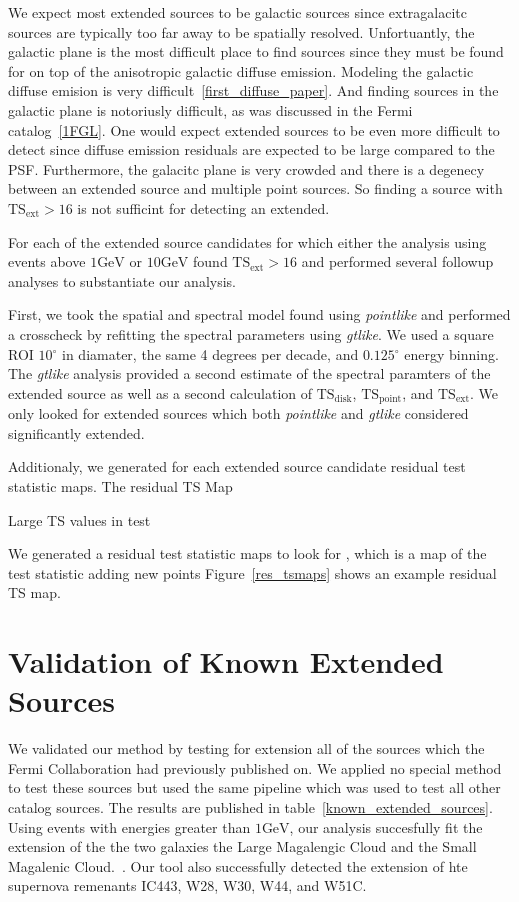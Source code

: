 \documentclass[preprint]{aastex}
\newcommand{\gev}{\text{GeV}\xspace}
\newcommand{\tsext}{\ensuremath{\text{TS}_\text{ext}}\xspace}
\newcommand{\ts}{\text{TS}\xspace}
\renewcommand{\deg}{\ensuremath{^\circ}\xspace}
\newcommand{\pointlike}{{\em pointlike}\xspace}
\newcommand{\gtlike}{{\em gtlike}\xspace}
\begin{document}
We expect most extended sources to be galactic sources since
extragalacitc sources are typically too far away to be spatially
resolved. Unfortuantly, the galactic plane is the most difficult place
to find sources since they must be found for on top of the anisotropic
galactic diffuse emission.  Modeling the galactic diffuse emision is
very difficult~\ref{first_diffuse_paper}.  And finding sources in the
galactic plane is notoriusly difficult, as was discussed in the Fermi
catalog~\ref{1FGL}. One would expect extended sources to be even more
difficult to detect since diffuse emission residuals are expected
to be large compared to the PSF. Furthermore, the galacitc plane
is very crowded and there is a degenecy between an extended source
and multiple point sources. So finding a source with
$\tsext>16$ is not sufficint for detecting an extended.

For each of the extended source candidates for which either the analysis
using events above $1\gev$ or $10\gev$ found $\tsext>16$
and performed several followup analyses to substantiate our analysis.

First, we took the spatial and spectral model found using \pointlike
and performed a crosscheck by refitting the spectral parameters using 
\gtlike.
We used a square ROI $10\deg$ in diamater, the same 4 degrees
per decade, and $0.125\deg$ energy binning.
The \gtlike analysis provided a second estimate of the spectral
paramters of the extended source as well as a second calculation of
$\ts_\text{disk}$, $\ts_\text{point}$, and 
$\tsext$. We only looked for extended sources which 
both \pointlike and \gtlike considered significantly extended.

Additionaly, we generated for each 
extended source candidate residual test statistic maps. 
The residual TS Map

Large
TS values in test 


We generated a residual test statistic maps to look for
, which is a map of the test
statistic adding new points
Figure~\ref{res_tsmaps} shows an example residual TS map.






\section{Validation of Known Extended Sources}
\label{validate_known}

We validated our method by testing for extension all of the sources
which the Fermi Collaboration had previously published on.  We applied
no special method to test these sources but used the same pipeline which
was used to test all other catalog sources.  The results are published
in table~\ref{known_extended_sources}.  Using events with energies
greater than $1\gev$, our analysis succesfully fit the extension of the
the two galaxies the Large Magalengic Cloud and the Small Magalenic
Cloud.~\cite{SMC & LMC Paper}.  Our tool also successfully detected the
extension of hte supernova remenants IC443, W28, W30, W44, and W51C.
\end{document}
